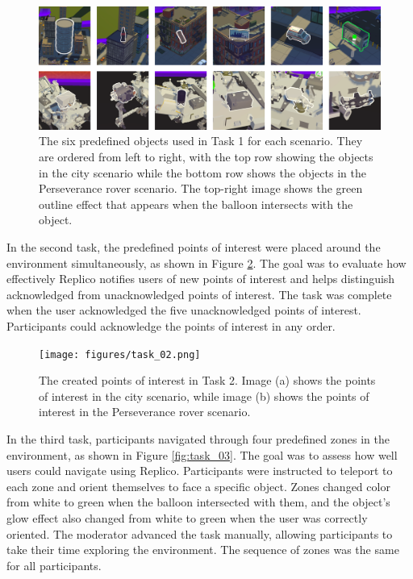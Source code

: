         \begin{figure}[h!]
            \centering
            \includegraphics[width=1\linewidth]{figures/task_01.png}
            \caption{The six predefined objects used in Task 1 for each scenario. They are ordered from left to right, with the top row showing the objects in the city scenario while the bottom row shows the objects in the Perseverance rover scenario. The top-right image shows the green outline effect that appears when the balloon intersects with the object.}
            \label{fig:task_01}
        \end{figure}

        In the second task, the predefined points of interest were placed around the environment simultaneously, as shown in Figure \ref{fig:task_02}. The goal was to evaluate how effectively Replico notifies users of new points of interest and helps distinguish acknowledged from unacknowledged points of interest. The task was complete when the user acknowledged the five unacknowledged points of interest. Participants could acknowledge the points of interest in any order.

        \begin{figure}[h!]
            \centering
            \texttt{[image: figures/task\_02.png]}
            \caption{The created points of interest in Task 2. Image (a) shows the points of interest in the city scenario, while image (b) shows the points of interest in the Perseverance rover scenario.}
            \label{fig:task_02}
        \end{figure}

        In the third task, participants navigated through four predefined zones in the environment, as shown in Figure \ref{fig:task_03}. The goal was to assess how well users could navigate using Replico. Participants were instructed to teleport to each zone and orient themselves to face a specific object. Zones changed color from white to green when the balloon intersected with them, and the object's glow effect also changed from white to green when the user was correctly oriented. The moderator advanced the task manually, allowing participants to take their time exploring the environment. The sequence of zones was the same for all participants.

